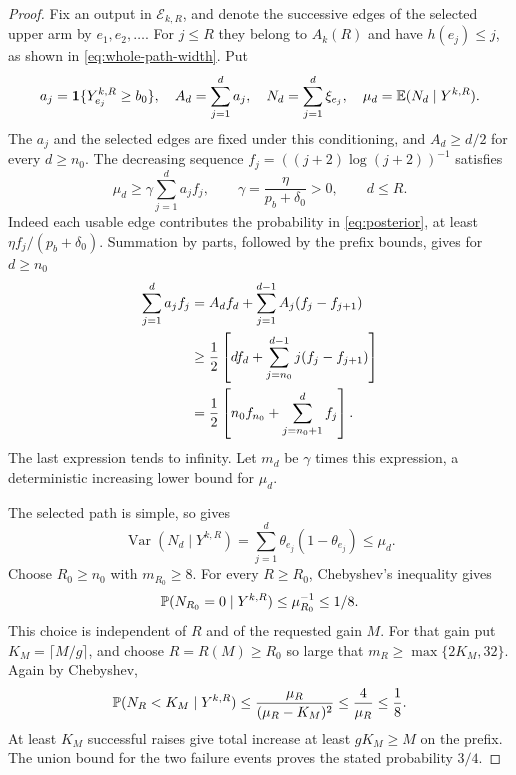 \begin{proof}
Fix an output in $\mathcal E_{k,R}$, and denote the successive edges of
the selected upper arm by $e_1,e_2,\ldots$.  For $j\leq R$ they belong
to $A_k(R)$ and have $h(e_j)\leq j$, as shown in
\eqref{eq:whole-path-width}.  Put
\[
 a_j=\mathbf1\{Y^{k,R}_{e_j}\geq b_0\},\quad
 A_d=\sum_{j=1}^d a_j,\quad
 N_d=\sum_{j=1}^d\xi_{e_j},\quad
 \mu_d=\mathbb E(N_d\mid Y^{k,R}).
\]
The $a_j$ and the selected edges are fixed under this conditioning, and
$A_d\geq d/2$ for every $d\geq n_0$.  The decreasing sequence
$f_j=((j+2)\log(j+2))^{-1}$ satisfies
\begin{equation}\label{eq:gain-mean}
 \mu_d\geq\gamma\sum_{j=1}^d a_jf_j,
 \qquad \gamma=\frac{\eta}{p_b+\delta_0}>0,
 \qquad d\leq R.
\end{equation}
Indeed each usable edge contributes the probability in
\eqref{eq:posterior}, at least $\eta f_j/(p_b+\delta_0)$.
Summation by parts, followed by the prefix bounds, gives for $d\geq n_0$
\begin{align}
 \sum_{j=1}^d a_jf_j
 &=A_df_d+\sum_{j=1}^{d-1}A_j(f_j-f_{j+1})\notag\\
 &\geq\frac12\left[df_d+
          \sum_{j=n_0}^{d-1}j(f_j-f_{j+1})\right]\notag\\
 &=\frac12\left[n_0f_{n_0}+\sum_{j=n_0+1}^df_j\right].
 \label{eq:abel-gain}
\end{align}
The last expression tends to infinity.  Let $m_d$ be $\gamma$ times
this expression, a deterministic increasing lower bound for $\mu_d$.

The selected path is simple, so  gives
\begin{equation}\label{eq:gain-variance}
 \operatorname{Var}(N_d\mid Y^{k,R})
   =\sum_{j=1}^d\theta_{e_j}(1-\theta_{e_j})\leq\mu_d.
\end{equation}
Choose $R_0\geq n_0$ with $m_{R_0}\geq8$.  For every $R\geq R_0$,
Chebyshev's inequality gives
\[
 \mathbb P(N_{R_0}=0\mid Y^{k,R})\leq\mu_{R_0}^{-1}\leq1/8.
\]
This choice is independent of $R$ and of the requested gain $M$.
For that gain put $K_M=\lceil M/g\rceil$, and choose $R=R(M)\geq R_0$
so large that $m_R\geq\max\{2K_M,32\}$.  Again by Chebyshev,
\[
 \mathbb P(N_R<K_M\mid Y^{k,R})
 \leq\frac{\mu_R}{(\mu_R-K_M)^2}
 \leq\frac4{\mu_R}\leq\frac18.
\]
At least $K_M$ successful raises give total increase at least
$gK_M\geq M$ on the prefix.  The union bound for the two failure events
proves the stated probability $3/4$.
\end{proof}

